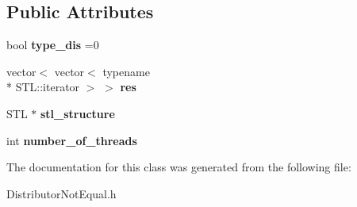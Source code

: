 \subsection*{Public Attributes}
\begin{DoxyCompactItemize}
\item 
\hypertarget{class_distributor_not_equal_aacfb373dcf12ede0b4c72dcf03eafddf}{bool {\bfseries type\-\_\-dis} =0}\label{class_distributor_not_equal_aacfb373dcf12ede0b4c72dcf03eafddf}

\item 
\hypertarget{class_distributor_not_equal_aca69c6491263ed7fc736c5fad7dffd58}{vector$<$ vector$<$ typename \\*
S\-T\-L\-::iterator $>$ $>$ {\bfseries res}}\label{class_distributor_not_equal_aca69c6491263ed7fc736c5fad7dffd58}

\item 
\hypertarget{class_distributor_not_equal_af551c63ba4819d8b4361d6c5f87b5937}{S\-T\-L $\ast$ {\bfseries stl\-\_\-structure}}\label{class_distributor_not_equal_af551c63ba4819d8b4361d6c5f87b5937}

\item 
\hypertarget{class_distributor_not_equal_a6a1795ab6d09a19f734d3f13b9f04458}{int {\bfseries number\-\_\-of\-\_\-threads}}\label{class_distributor_not_equal_a6a1795ab6d09a19f734d3f13b9f04458}

\end{DoxyCompactItemize}


The documentation for this class was generated from the following file\-:\begin{DoxyCompactItemize}
\item 
Distributor\-Not\-Equal.\-h\end{DoxyCompactItemize}
